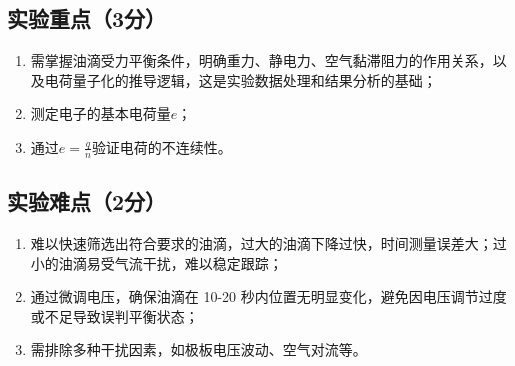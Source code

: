 \documentclass[yuxi]{../template/Report}%
\begin{document}
\subsection{实验重点（3分）}
\begin{enumerate}
    \item 需掌握油滴受力平衡条件，明确重力、静电力、空气黏滞阻力的作用关系，以及电荷量子化的推导逻辑，这是实验数据处理和结果分析的基础；
    \item 测定电子的基本电荷量$e$；
    \item 通过\(e = \frac{q}{n}\)验证电荷的不连续性。
\end{enumerate}

\subsection{实验难点（2分）}
\begin{enumerate}
    \item 难以快速筛选出符合要求的油滴，过大的油滴下降过快，时间测量误差大；过小的油滴易受气流干扰，难以稳定跟踪；
    \item 通过微调电压，确保油滴在 10-20 秒内位置无明显变化，避免因电压调节过度或不足导致误判平衡状态；
    \item 需排除多种干扰因素，如极板电压波动、空气对流等。
\end{enumerate}
\end{document}
